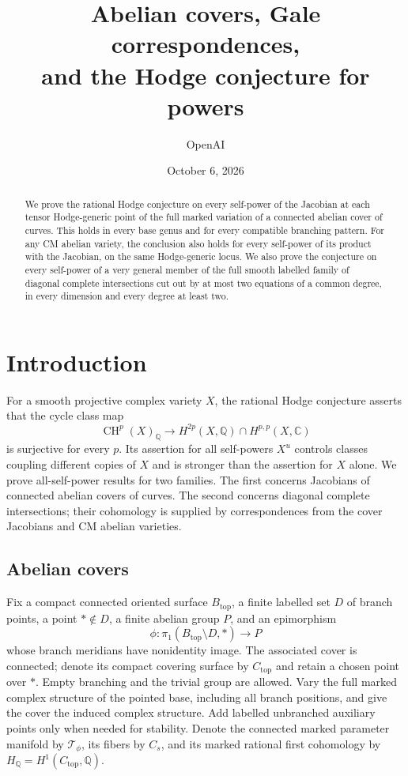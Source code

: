 \documentclass[11pt]{article}
\title{Abelian covers, Gale correspondences,\\
and the Hodge conjecture for powers}
\author{OpenAI}
\date{October 6, 2026}
\newcommand{\Q}{\mathbb Q}
\newcommand{\C}{\mathbb C}
\newcommand{\CH}{\operatorname{CH}}
\theoremstyle{plain}
\theoremstyle{definition}
\theoremstyle{remark}
\numberwithin{equation}{section}
\begin{document}
\maketitle

\begin{abstract}
We prove the rational Hodge conjecture on every self-power of the
Jacobian at each tensor Hodge-generic point of the full marked variation
of a connected abelian cover of curves.  This holds in every base genus
and for every compatible branching pattern.  For any CM abelian variety,
the conclusion also holds for every self-power of its product with the
Jacobian, on the same Hodge-generic locus.
We also prove the conjecture on every self-power of a very general
member of the full smooth labelled family of diagonal complete
intersections cut out by at most two equations of a common degree, in
every dimension and every degree at least two.
\end{abstract}

\tableofcontents

\section{Introduction}

For a smooth projective complex variety \(X\), the rational Hodge
conjecture asserts that the cycle class map
\[
 \CH^p(X)_\Q\longrightarrow
 H^{2p}(X,\Q)\cap H^{p,p}(X,\C)
\]
is surjective for every \(p\).  Its assertion for all self-powers
\(X^u\) controls classes coupling different copies of \(X\) and is
stronger than the assertion for \(X\) alone.  We prove all-self-power
results for two families.  The first concerns Jacobians of connected
abelian covers of curves.  The second concerns diagonal complete
intersections; their cohomology is supplied by correspondences from
the cover Jacobians and CM abelian varieties.

\subsection{Abelian covers}

Fix a compact connected oriented surface \(B_{\mathrm{top}}\), a finite
labelled set \(D\) of branch points, a point \(*\notin D\), a finite
abelian group \(P\), and an epimorphism
\[
 \phi:\pi_1(B_{\mathrm{top}}\setminus D,*)\longrightarrow P
\]
whose branch meridians have nonidentity image.  The associated cover is
connected; denote its compact covering surface by \(C_{\mathrm{top}}\)
and retain a chosen point over \(*\).  Empty branching and the
trivial group are allowed.  Vary the full marked complex structure of
the pointed base, including all branch positions, and give the cover
the induced complex structure.  Add labelled unbranched auxiliary
points only when needed for stability.  Denote the connected marked
parameter manifold by \(\mathcal T_\phi\), its fibers by \(C_s\), and its marked
rational first cohomology by
\(H_\Q=H^1(C_{\mathrm{top}},\Q)\).
\end{document}
